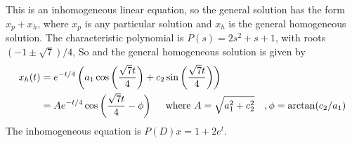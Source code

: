 This is an inhomogeneous linear equation, so the general solution has the form
$x_p + x_h$, where $x_p$ is any particular solution and $x_h$ is the
general homogeneous solution.
The characteristic polynomial is $P(s) = 2s^2 + s + 1$, with roots$(-1 \pm \sqrt{7})/4$,
So and the general homogeneous solution is given by
\begin{align*}
  \displaystyle x_h(t)
  \displaystyle &=e^{-t/4}\left(a_1\cos \left( \frac{\sqrt {7} t}{4}\right)
                  +c_2\sin \left( \frac{\sqrt {7}t}{4}\right)\right) \\
  \displaystyle &=Ae^{-t/4}\cos \left(\frac{\sqrt {7}t}{4}-\phi \right)
                  \quad \text{ where } A = \sqrt{a_1^2 + c_2^2}
                  \quad, \phi = \arctan(c_2 / a_1)                    
\end{align*}
The inhomogeneous equation is $P(D)x = 1 + 2e^{t}$.




\clearpage

